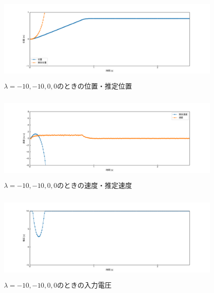 \documentclass[12pt]{jsarticle}
\begin{document}
\begin{figure}[H]
  \begin{center}
    \includegraphics[clip,width=13.0cm, height=4.4cm]{../img/Exp6-1.png}
    \caption{$\lambda=-10, -10, 0, 0$のときの位置・推定位置}
    \label{Exp6-1}
  \end{center}
\end{figure}
\begin{figure}[H]
  \begin{center}
    \includegraphics[clip,width=13.0cm, height=4.4cm]{../img/Exp6-2.png}
    \caption{$\lambda=-10, -10, 0, 0$のときの速度・推定速度}
    \label{Exp6-2}
  \end{center}
\end{figure}
\begin{figure}[H]
  \begin{center}
    \includegraphics[clip,width=13.0cm, height=4.4cm]{../img/Exp6-3.png}
    \caption{$\lambda=-10, -10, 0, 0$のときの入力電圧}
    \label{Exp6-3}
  \end{center}
\end{figure}
\end{document}
